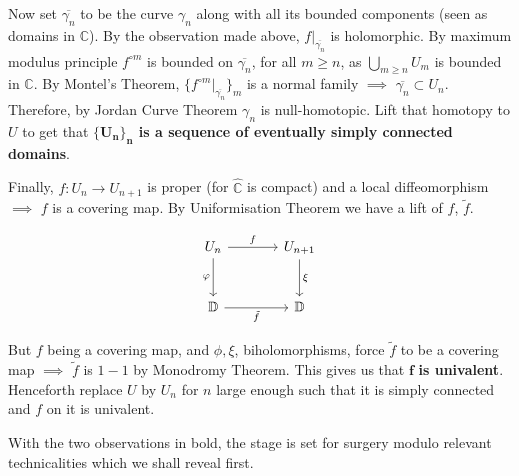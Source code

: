 \documentclass[11pt,a4paper]{article}
\begin{document}
        Now set $\overline{\gamma_n}$ to be the curve $\gamma_n$ along with all its bounded components (seen as domains in $\mathbb{C}$). By the observation made above, $f\big|_{\overline{\gamma_n}}$ is holomorphic. By maximum modulus principle $f^{\circ m}$ is bounded on $\overline{\gamma_n}$, for all $m\geq n$, as $\bigcup_{m\geq n}U_m$ is bounded in $\mathbb{C}$. By Montel's Theorem, $\{f^{\circ m}\big|_{\overline{\gamma_n}}\}_m$ is a normal family $\implies$ $\overline{\gamma_n} \subset U_n$. Therefore, by Jordan Curve Theorem $\gamma_n$ is null-homotopic. Lift that homotopy to $U$ to get that \textbf{$\mathbf{\{U_n\}_n}$ is a sequence of eventually simply connected domains}.

        Finally, $f:U_n \rightarrow U_{n+1}$ is proper (for $\hat{\mathbb{C}}$ is compact) and a local diffeomorphism $\implies$ $f$ is a covering map. By Uniformisation Theorem we have a lift of $f$, $\tilde{f}$.

        $$\begin{tikzcd}[column sep = large, row sep = large]
        U_n \arrow[r, "f"] \arrow[d, "\phi"']
        & U_{n+1} \arrow[d, "\xi"] \\
        \mathbb{D} \arrow[r,"\tilde{f}"']
        & \mathbb{D}
        \end{tikzcd}$$


        But $f$ being a covering map, and $\phi, \xi$, biholomorphisms, force $\tilde{f}$ to be a covering map $\implies$ $\tilde{f}$ is $1-1$ by Monodromy Theorem. This gives us that $\mathbf{f}$ \textbf{is univalent}. Henceforth replace $U$ by $U_n$ for $n$ large enough such that it is simply connected and $f$ on it is univalent.

        With the two observations in bold, the stage is set for surgery modulo relevant technicalities which we shall reveal first.

\end{document}
